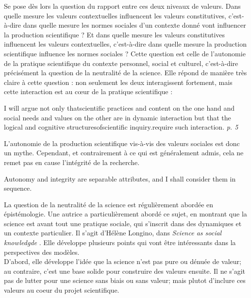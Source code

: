 Se pose dès lors la question du rapport entre ces deux niveaux de valeurs. Dans quelle mesure les valeurs contextuelles influencent les valeurs constitutives, c'est-à-dire dans quelle mesure les normes sociales d'un contexte donné vont influencer la production scientifique ? Et dans quelle mesure les valeurs constitutives influencent les valeurs contextuelles, c'est-à-dire dans quelle mesure la production scientifique influence les normes sociales ? Cette question est celle de l'autonomie de la pratique scientifique du contexte personnel, social et culturel, c'est-à-dire précisément la question de la neutralité de la science. Elle répond de manière très claire à cette question : non seulement les deux interagissent fortement, mais cette interaction est au cœur de la pratique scientifique : 

\begin{displayquote}
    I will argue not only thatscientific practices and content on the one hand and social needs and values on the other are in dynamic interaction but that the logical and cognitive structuresofscientific inquiry.require such interaction. \textit{p. 5}
\end{displayquote}

L'autonomie de la production scientifique vis-à-vis des valeurs sociales est donc un mythe. Cependant, et contrairement à ce qui est généralement admis, cela ne remet pas en cause l'intégrité de la recherche. 

\begin{displayquote}
    Autonomy and integrity are separable attributes, and I shall consider them in sequence.
\end{displayquote}

La question de la neutralité de la science est régulièrement abordée en épistémologie. Une autrice a particulièrement abordé ce sujet, en montrant que la science est avant tout une pratique sociale, qui s'inscrit dans des dynamiques et un contexte particulier. Il s'agit d'Hélène Longino, dans \emph{Science as social knowledgde} \cite{longino_science_1990}. Elle développe plusieurs points qui vont être intéressants dans la perspectives des modèles. \\

D'abord, elle développe l'idée que la science n'est pas pure ou dénuée de valeur; au contraire, c'est une base solide pour construire des valeurs ensuite. Il ne s'agit pas de lutter pour une science sans biais ou sans valeur; mais plutot d'inclure ces valeurs au coeur du projet scientifique. 

